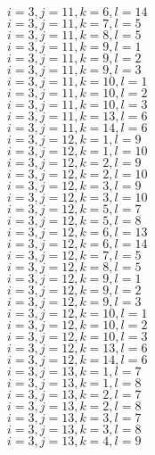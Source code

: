 \documentclass[14pt]{article}
\begin{document}
    $i=3,j=11,k=6,l=14 $ \\ 
    $i=3,j=11,k=7,l=5 $ \\ 
    $i=3,j=11,k=8,l=5 $ \\ 
    $i=3,j=11,k=9,l=1 $ \\ 
    $i=3,j=11,k=9,l=2 $ \\ 
    $i=3,j=11,k=9,l=3 $ \\ 
    $i=3,j=11,k=10,l=1 $ \\ 
    $i=3,j=11,k=10,l=2 $ \\ 
    $i=3,j=11,k=10,l=3 $ \\ 
    $i=3,j=11,k=13,l=6 $ \\ 
    $i=3,j=11,k=14,l=6 $ \\ 
    $i=3,j=12,k=1,l=9 $ \\ 
    $i=3,j=12,k=1,l=10 $ \\ 
    $i=3,j=12,k=2,l=9 $ \\ 
    $i=3,j=12,k=2,l=10 $ \\ 
    $i=3,j=12,k=3,l=9 $ \\ 
    $i=3,j=12,k=3,l=10 $ \\ 
    $i=3,j=12,k=5,l=7 $ \\ 
    $i=3,j=12,k=5,l=8 $ \\ 
    $i=3,j=12,k=6,l=13 $ \\ 
    $i=3,j=12,k=6,l=14 $ \\ 
    $i=3,j=12,k=7,l=5 $ \\ 
    $i=3,j=12,k=8,l=5 $ \\ 
    $i=3,j=12,k=9,l=1 $ \\ 
    $i=3,j=12,k=9,l=2 $ \\ 
    $i=3,j=12,k=9,l=3 $ \\ 
    $i=3,j=12,k=10,l=1 $ \\ 
    $i=3,j=12,k=10,l=2 $ \\ 
    $i=3,j=12,k=10,l=3 $ \\ 
    $i=3,j=12,k=13,l=6 $ \\ 
    $i=3,j=12,k=14,l=6 $ \\ 
    $i=3,j=13,k=1,l=7 $ \\ 
    $i=3,j=13,k=1,l=8 $ \\ 
    $i=3,j=13,k=2,l=7 $ \\ 
    $i=3,j=13,k=2,l=8 $ \\ 
    $i=3,j=13,k=3,l=7 $ \\ 
    $i=3,j=13,k=3,l=8 $ \\ 
    $i=3,j=13,k=4,l=9 $ \\ 
\end{document}
